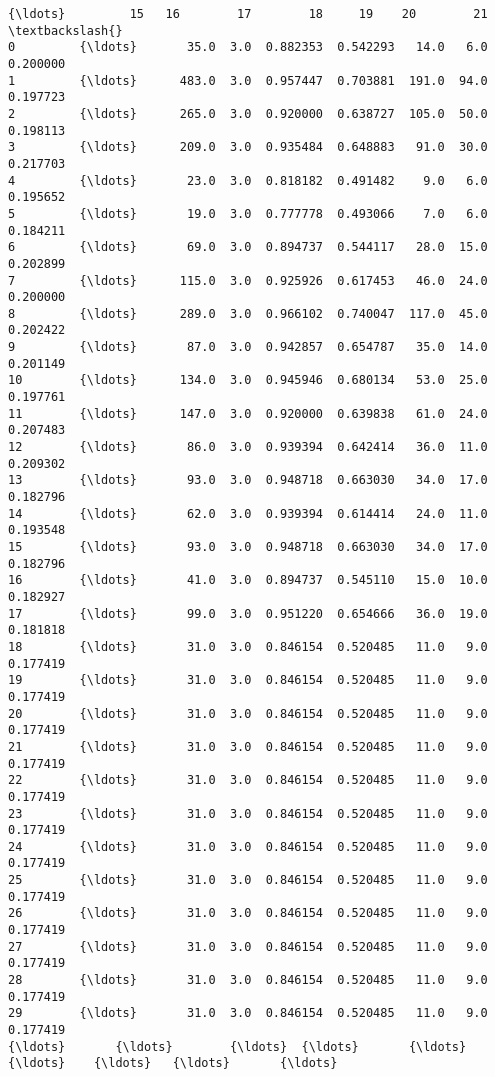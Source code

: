 \documentclass[11pt]{article}
\begin{document}
\begin{Verbatim}[commandchars=\\\{\}]
          {\ldots}         15   16        17        18     19    20        21  \textbackslash{}
0         {\ldots}       35.0  3.0  0.882353  0.542293   14.0   6.0  0.200000   
1         {\ldots}      483.0  3.0  0.957447  0.703881  191.0  94.0  0.197723   
2         {\ldots}      265.0  3.0  0.920000  0.638727  105.0  50.0  0.198113   
3         {\ldots}      209.0  3.0  0.935484  0.648883   91.0  30.0  0.217703   
4         {\ldots}       23.0  3.0  0.818182  0.491482    9.0   6.0  0.195652   
5         {\ldots}       19.0  3.0  0.777778  0.493066    7.0   6.0  0.184211   
6         {\ldots}       69.0  3.0  0.894737  0.544117   28.0  15.0  0.202899   
7         {\ldots}      115.0  3.0  0.925926  0.617453   46.0  24.0  0.200000   
8         {\ldots}      289.0  3.0  0.966102  0.740047  117.0  45.0  0.202422   
9         {\ldots}       87.0  3.0  0.942857  0.654787   35.0  14.0  0.201149   
10        {\ldots}      134.0  3.0  0.945946  0.680134   53.0  25.0  0.197761   
11        {\ldots}      147.0  3.0  0.920000  0.639838   61.0  24.0  0.207483   
12        {\ldots}       86.0  3.0  0.939394  0.642414   36.0  11.0  0.209302   
13        {\ldots}       93.0  3.0  0.948718  0.663030   34.0  17.0  0.182796   
14        {\ldots}       62.0  3.0  0.939394  0.614414   24.0  11.0  0.193548   
15        {\ldots}       93.0  3.0  0.948718  0.663030   34.0  17.0  0.182796   
16        {\ldots}       41.0  3.0  0.894737  0.545110   15.0  10.0  0.182927   
17        {\ldots}       99.0  3.0  0.951220  0.654666   36.0  19.0  0.181818   
18        {\ldots}       31.0  3.0  0.846154  0.520485   11.0   9.0  0.177419   
19        {\ldots}       31.0  3.0  0.846154  0.520485   11.0   9.0  0.177419   
20        {\ldots}       31.0  3.0  0.846154  0.520485   11.0   9.0  0.177419   
21        {\ldots}       31.0  3.0  0.846154  0.520485   11.0   9.0  0.177419   
22        {\ldots}       31.0  3.0  0.846154  0.520485   11.0   9.0  0.177419   
23        {\ldots}       31.0  3.0  0.846154  0.520485   11.0   9.0  0.177419   
24        {\ldots}       31.0  3.0  0.846154  0.520485   11.0   9.0  0.177419   
25        {\ldots}       31.0  3.0  0.846154  0.520485   11.0   9.0  0.177419   
26        {\ldots}       31.0  3.0  0.846154  0.520485   11.0   9.0  0.177419   
27        {\ldots}       31.0  3.0  0.846154  0.520485   11.0   9.0  0.177419   
28        {\ldots}       31.0  3.0  0.846154  0.520485   11.0   9.0  0.177419   
29        {\ldots}       31.0  3.0  0.846154  0.520485   11.0   9.0  0.177419   
{\ldots}       {\ldots}        {\ldots}  {\ldots}       {\ldots}       {\ldots}    {\ldots}   {\ldots}       {\ldots}   

\end{Verbatim}
\end{document}
